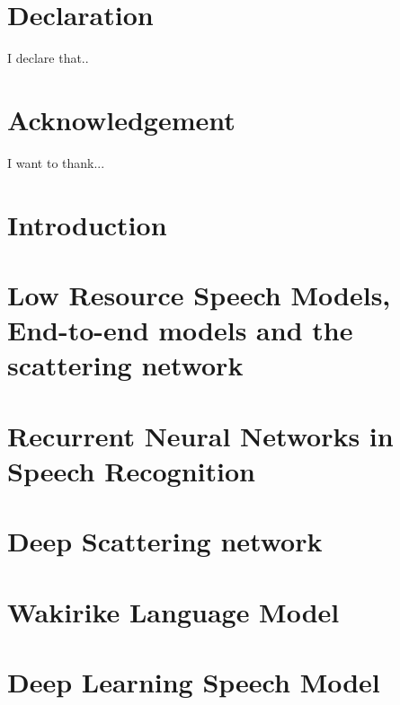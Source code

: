\documentclass[12pt,twoside]{report}
\begin{document}
\chapter*{Declaration}
I declare that..

\chapter*{Acknowledgement}
I want to thank...

\tableofcontents

\chapter{Introduction}


\chapter{Low Resource Speech Models, End-to-end models and the scattering network}\label{c02}


\chapter{Recurrent Neural Networks in Speech Recognition}


\chapter{Deep Scattering network}


\chapter{Wakirike Language Model}


\chapter{Deep Learning Speech Model}





\end{document}
